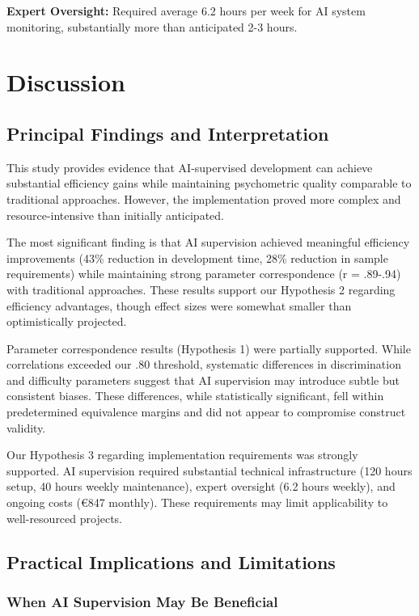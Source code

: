 \documentclass[12pt,a4paper]{article}
\begin{document}
\textbf{Expert Oversight:} Required average 6.2 hours per week for AI system monitoring, substantially more than anticipated 2-3 hours.

\section{Discussion}

\subsection{Principal Findings and Interpretation}

This study provides evidence that AI-supervised development can achieve substantial efficiency gains while maintaining psychometric quality comparable to traditional approaches. However, the implementation proved more complex and resource-intensive than initially anticipated.

The most significant finding is that AI supervision achieved meaningful efficiency improvements (43\% reduction in development time, 28\% reduction in sample requirements) while maintaining strong parameter correspondence (r = .89-.94) with traditional approaches. These results support our Hypothesis 2 regarding efficiency advantages, though effect sizes were somewhat smaller than optimistically projected.

Parameter correspondence results (Hypothesis 1) were partially supported. While correlations exceeded our .80 threshold, systematic differences in discrimination and difficulty parameters suggest that AI supervision may introduce subtle but consistent biases. These differences, while statistically significant, fell within predetermined equivalence margins and did not appear to compromise construct validity.

Our Hypothesis 3 regarding implementation requirements was strongly supported. AI supervision required substantial technical infrastructure (120 hours setup, 40 hours weekly maintenance), expert oversight (6.2 hours weekly), and ongoing costs (€847 monthly). These requirements may limit applicability to well-resourced projects.

\subsection{Practical Implications and Limitations}

\subsubsection{When AI Supervision May Be Beneficial}
\end{document}
